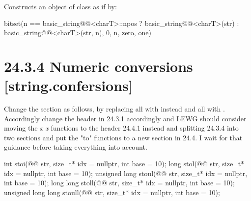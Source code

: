 \documentclass[ebook,11pt,article]{memoir}
\begin{document}
\begin{itemdescr}
\pnum
\effects Constructs an object of class  as if by:
\begin{codeblock}
bitset(n == basic_string@@<charT>::npos
          ? basic_string@@<charT>(str)
          : basic_string@@<charT>(str, n),
       0, n, zero, one)
\end{codeblock}
\end{itemdescr}


\section{24.3.4 Numeric conversions [string.confersions]}
Change the section as follows, by replacing all  with  instead and 
all  with . Accordingly change the header in 24.3.1 accordingly and LEWG should consider moving the \textit{x} \textit{x} functions to the  header 24.4.1 instead and splitting 24.3.4 into two sections and put the "to" functions to a new section in 24.4. I wait for that guidance before taking everything into account.


\begin{itemdecl}
int stoi(@@ str, size_t* idx = nullptr, int base = 10);
long stol(@@ str, size_t* idx = nullptr, int base = 10);
unsigned long stoul(@@ str, size_t* idx = nullptr, int base = 10);
long long stoll(@@ str, size_t* idx = nullptr, int base = 10);
unsigned long long stoull(@@ str, size_t* idx = nullptr, int base = 10);
\end{itemdecl}
\end{document}
